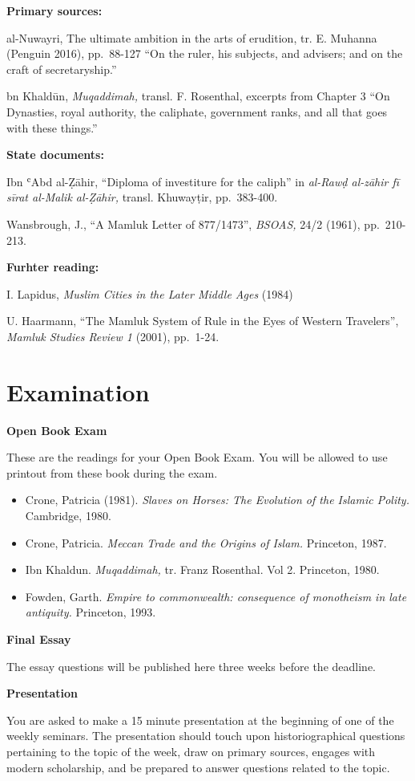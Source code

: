 \documentclass[
]{book}
\begin{document}
\textbf{Primary sources:}

al-Nuwayri, The ultimate ambition in the arts of erudition, tr. E. Muhanna (Penguin 2016), pp.~88-127 ``On the ruler, his subjects, and advisers; and on the craft of secretaryship.''

bn Khaldūn, \emph{Muqaddimah,} transl. F. Rosenthal, excerpts from Chapter 3 ``On Dynasties, royal authority, the caliphate, government ranks, and all that goes with these things.''

\textbf{State documents:}

Ibn ʿAbd al-Ẓāhir, ``Diploma of investiture for the caliph'' in \emph{al-Rawḍ al-zāhir fī sīrat al-Malik al-Ẓāhir,} transl. Khuwayṭir, pp.~383-400.

Wansbrough, J., ``A Mamluk Letter of 877/1473'', \emph{BSOAS,} 24/2 (1961), pp.~210-213.

\textbf{Furhter reading:}

I. Lapidus, \emph{Muslim Cities in the Later Middle Ages} (1984)

U. Haarmann, ``The Mamluk System of Rule in the Eyes of Western Travelers'', \emph{Mamluk Studies Review 1} (2001), pp.~1-24.

\hypertarget{examination}{%
\chapter*{Examination}\label{examination}}

\textbf{Open Book Exam}

These are the readings for your Open Book Exam. You will be allowed to use printout from these book during the exam.

\begin{itemize}
\item
  Crone, Patricia (1981). \emph{Slaves on Horses: The Evolution of the Islamic Polity.} Cambridge, 1980.
\item
  Crone, Patricia. \emph{Meccan Trade and the Origins of Islam.} Princeton, 1987.
\item
  Ibn Khaldun. \emph{Muqaddimah,} tr. Franz Rosenthal. Vol 2. Princeton, 1980.
\item
  Fowden, Garth. \emph{Empire to commonwealth: consequence of monotheism in late antiquity.} Princeton, 1993.
\end{itemize}

\textbf{Final Essay}

The essay questions will be published here three weeks before the deadline.

\textbf{Presentation}

You are asked to make a 15 minute presentation at the beginning of one of the weekly seminars. The presentation should touch upon historiographical questions pertaining to the topic of the week, draw on primary sources, engages with modern scholarship, and be prepared to answer questions related to the topic.

  
\end{document}
